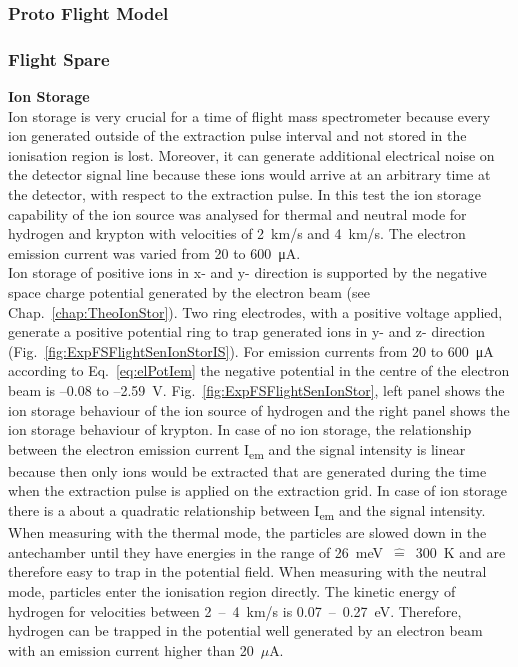 		\subsubsection{Proto Flight Model}\label{sec:paper}
		\clearpage
		\newpage
		\thispagestyle{empty}
		\null
		\newpage
		
		
		\newpage
		
		\subsubsection{Flight Spare}\label{chap:FSCalib}
		\textbf{Ion Storage}\\
		Ion storage is very crucial for a time of flight mass spectrometer because every ion generated outside of the extraction pulse interval and not stored in the ionisation region is lost. Moreover, it can generate additional electrical noise on the detector signal line because these ions would arrive at an arbitrary time at the detector, with respect to the extraction pulse. In this test the ion storage capability of the ion source was analysed for thermal and neutral mode for hydrogen and krypton with velocities of 2~km/s and 4~km/s. The electron emission current was varied from 20 to 600~\si{\micro\ampere}.\\
		Ion storage of positive ions in x- and y- direction is supported by the negative space charge potential generated by the electron beam (see Chap.~\ref{chap:TheoIonStor}). Two ring electrodes, with a positive voltage applied, generate a positive potential ring to trap generated ions in y- and z- direction (Fig.~\ref{fig:ExpFSFlightSenIonStorIS}). For emission currents from 20 to 600~\si{\micro\ampere} according to Eq.~\eqref{eq:elPotIem} the negative potential in the centre of the electron beam is --0.08 to --2.59~V. Fig.~\ref{fig:ExpFSFlightSenIonStor}, left panel shows the ion storage behaviour of the ion source of hydrogen and the right panel shows the ion storage behaviour of krypton. In case of no ion storage, the relationship between the electron emission current I\textsubscript{em} and the signal intensity is linear because then only ions would be extracted that are generated during the time when the extraction pulse is applied on the extraction grid. In case of ion storage there is a about a quadratic relationship between I\textsubscript{em} and the signal intensity.\\
		When measuring with the thermal mode, the particles are slowed down in the antechamber until they have energies in the range of 26~meV~$\widehat{=}$~300~K and are therefore easy to trap in the potential field. When measuring with the neutral mode, particles enter the ionisation region directly. The kinetic energy of hydrogen for velocities between 2~--~4~km/s is 0.07~--~0.27~eV. Therefore, hydrogen can be trapped in the potential well generated by an electron beam with an emission current higher than 20~$\mu$A.\\
